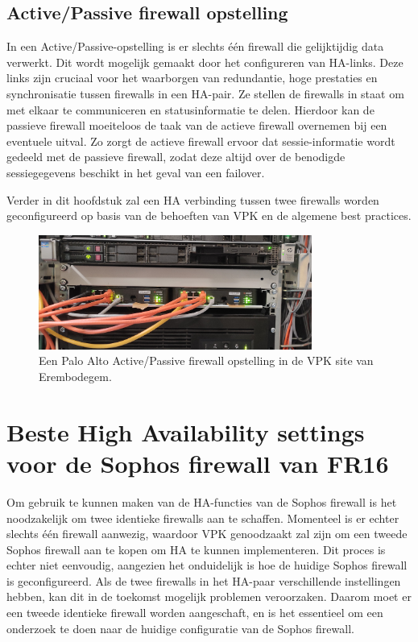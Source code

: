 \subsection{Active/Passive firewall opstelling}

In een Active/Passive-opstelling is er slechts één firewall die gelijktijdig data verwerkt. Dit wordt mogelijk gemaakt door het configureren van HA-links. Deze links zijn cruciaal voor het waarborgen van redundantie, hoge prestaties en synchronisatie tussen firewalls in een HA-pair. Ze stellen de firewalls in staat om met elkaar te communiceren en statusinformatie te delen. Hierdoor kan de passieve firewall moeiteloos de taak van de actieve firewall overnemen bij een eventuele uitval. Zo zorgt de actieve firewall ervoor dat sessie-informatie wordt gedeeld met de passieve firewall, zodat deze altijd over de benodigde sessiegegevens beschikt in het geval van een failover. \autocite{PaloAltoHA2025} \autocite{PaloAltoHAb2025}

Verder in dit hoofdstuk zal een HA verbinding tussen twee firewalls worden geconfigureerd op basis van de behoeften van VPK en de algemene best practices.

\begin{figure}[H]
    \centering
    \includegraphics[width=0.8\textwidth]{fotos/PA_FirewallPairBE02.jpg}
    \caption[Palo Alto Active/Passive pair]{\label{fig:grail}Een Palo Alto Active/Passive firewall opstelling in de VPK site van Erembodegem.}
\end{figure} 



\section{Beste High Availability settings voor de Sophos firewall van FR16}

Om gebruik te kunnen maken van de HA-functies van de Sophos firewall is het noodzakelijk om twee identieke firewalls aan te schaffen. Momenteel is er echter slechts één firewall aanwezig, waardoor VPK genoodzaakt zal zijn om een tweede Sophos firewall aan te kopen om HA te kunnen implementeren. Dit proces is echter niet eenvoudig, aangezien het onduidelijk is hoe de huidige Sophos firewall is geconfigureerd. Als de twee firewalls in het HA-paar verschillende instellingen hebben, kan dit in de toekomst mogelijk problemen veroorzaken. Daarom moet er een tweede identieke firewall worden aangeschaft, en is het essentieel om een onderzoek te doen naar de huidige configuratie van de Sophos firewall.



